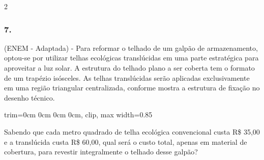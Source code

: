 \documentclass[twoside, 10pt, a4paper]{article}
\newlength{\espacoQuestao}\setlength{\espacoQuestao}{0.2cm}
\newcommand{\larguraTikz}{0.85\linewidth}
\begin{document}
\begin{multicols*}{2}
\subsubsection*{7.} (ENEM - Adaptada) - Para reformar o telhado de um galpão de armazenamento, optou-se por utilizar telhas ecológicas translúcidas em uma parte estratégica para aproveitar a luz solar. A estrutura do telhado plano a ser coberta tem o formato de um trapézio isósceles. As telhas translúcidas serão aplicadas exclusivamente em uma região triangular centralizada, conforme mostra a estrutura de fixação no desenho técnico.
\begin{center}
\begin{adjustbox}{trim=0cm 0cm 0cm 0cm, clip, max width=\larguraTikz}
\end{adjustbox}
\end{center}
Sabendo que cada metro quadrado de telha ecológica convencional custa R\$ 35,00 e a translúcida custa R\$ 60,00, qual será o custo total, apenas em material de cobertura, para revestir integralmente o telhado desse galpão?
\par\vspace{\espacoQuestao}


\end{multicols*}
\end{document}
